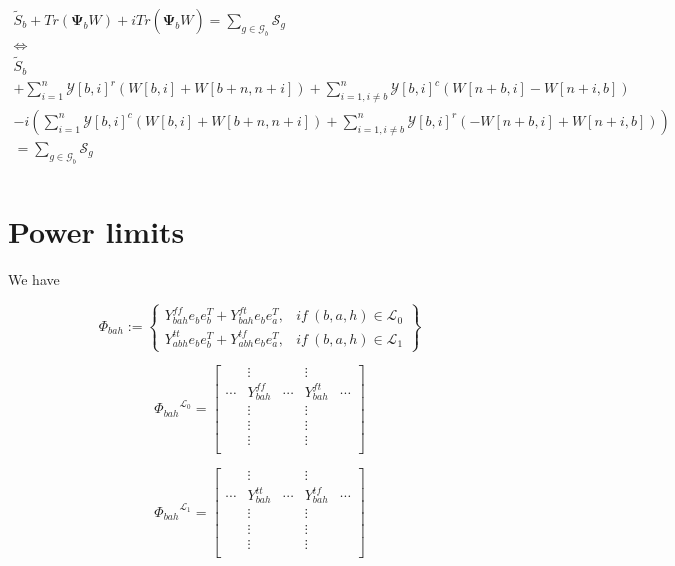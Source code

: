 \documentclass{article}
\begin{document}
\[
    \begin{array}{ll}
    \tilde{S}_b + Tr(\mathbf{\Psi}_b W) + iTr(\mathbf{\hat{\Psi}}_b W) = \sum\limits_{g \in \mathcal{G}_b} \mathcal{S}_g \\
                                                                     \Leftrightarrow \\
    \tilde{S}_b &\\
    + \sum\limits_{i=1}^n \mathcal{Y}[b, i]^r (W[b, i] + W[b + n, n + i]) + \sum\limits_{i=1, i \neq b}^n \mathcal{Y}[b, i]^c (W[n + b, i] - W[n + i, b]) &\\
    - i\left(\sum\limits_{i=1}^n \mathcal{Y}[b, i]^c (W[b, i] + W[b + n, n + i]) + \sum\limits_{i=1, i \neq b}^n \mathcal{Y}[b, i]^r (- W[n + b, i] + W[n + i, b]) \right) &\\
    = \sum\limits_{g \in \mathcal{G}_b} \mathcal{S}_g \\
    \end{array}
\]

\section{Power limits}

We have

\[
    \Phi_{bah} := \left\{
        \begin{array}{ll}
            Y^{ff}_{bah}e_be_b^T + Y^{ft}_{bah}e_be_a^T, &if\ (b, a, h) \in \mathcal{L}_0 \\
            Y^{tt}_{abh}e_be_b^T + Y^{tf}_{abh}e_be_a^T, &if\ (b, a, h) \in \mathcal{L}_1
        \end{array}
        \right\}
\]

\[
    {\Phi_{bah}}^{\mathcal{L}_0} =
    \begin{bmatrix}
                & \vdots        &        & \vdots       &              \\
        \cdots  & Y^{ff}_{bah}  & \cdots & Y^{ft}_{bah} & \cdots\\
                & \vdots        &        & \vdots       &              \\
                & \vdots        &        & \vdots       &              \\
                & \vdots        &        & \vdots       &              \\
    \end{bmatrix}
\]

\[
    {\Phi_{bah}}^{\mathcal{L}_1} =
    \begin{bmatrix}
                & \vdots        &        & \vdots       &              \\
        \cdots  & Y^{tt}_{bah}  & \cdots & Y^{tf}_{bah} & \cdots\\
                & \vdots        &        & \vdots       &              \\
                & \vdots        &        & \vdots       &              \\
                & \vdots        &        & \vdots       &              \\
    \end{bmatrix}
\]
\end{document}

